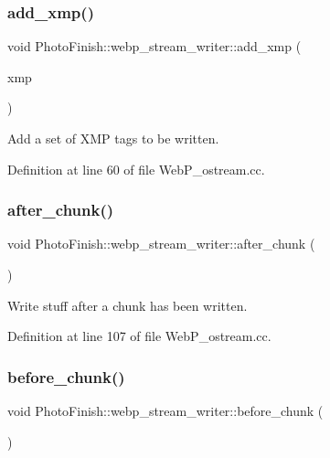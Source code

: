 \subsubsection{\texorpdfstring{add\+\_\+xmp()}{add\_xmp()}}
{\footnotesize\ttfamily void Photo\+Finish\+::webp\+\_\+stream\+\_\+writer\+::add\+\_\+xmp (\begin{DoxyParamCaption}\item[{const Exiv2\+::\+Xmp\+Data \&}]{xmp }\end{DoxyParamCaption})}



Add a set of X\+MP tags to be written. 



Definition at line 60 of file Web\+P\+\_\+ostream.\+cc.

\mbox{\label{class_photo_finish_1_1webp__stream__writer_a6f24700d93d1d2d02efad82550b0398b}} 
\subsubsection{\texorpdfstring{after\+\_\+chunk()}{after\_chunk()}}
{\footnotesize\ttfamily void Photo\+Finish\+::webp\+\_\+stream\+\_\+writer\+::after\+\_\+chunk (\begin{DoxyParamCaption}\item[{void}]{ }\end{DoxyParamCaption})}



Write stuff after a chunk has been written. 



Definition at line 107 of file Web\+P\+\_\+ostream.\+cc.

\mbox{\label{class_photo_finish_1_1webp__stream__writer_ad5f4e2e62be1f16dd4160bbd8fd2b1cc}} 
\subsubsection{\texorpdfstring{before\+\_\+chunk()}{before\_chunk()}}
{\footnotesize\ttfamily void Photo\+Finish\+::webp\+\_\+stream\+\_\+writer\+::before\+\_\+chunk (\begin{DoxyParamCaption}\item[{void}]{ }\end{DoxyParamCaption})}



